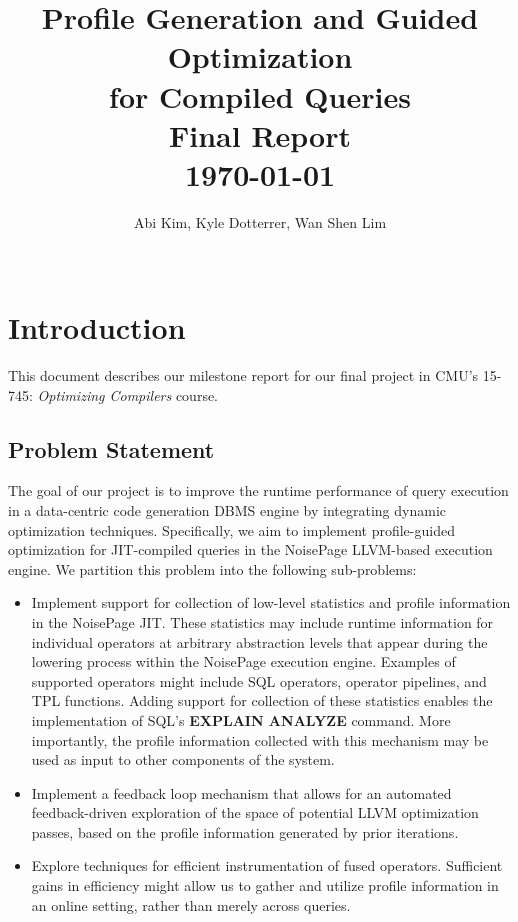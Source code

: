 \documentclass{vldb}
\newcommand{\paperTitle}{Profile Generation and Guided Optimization\\ for Compiled Queries\\ 
    \large Final Report\\
    \today}
\newcommand{\dbCode}[1]{{\sffamily\small \textbf{#1}}\xspace}
\begin{document}
\title{\paperTitle}

\author{
    \alignauthor Abi Kim, Kyle Dotterrer, Wan Shen Lim\\
    \\
}

\makeatletter
\def\@copyrightspace{\relax}
\makeatother

\maketitle


\section{Introduction}

This document describes our milestone report for our final project in CMU's 15-745: \textit{Optimizing Compilers} course. 

\subsection{Problem Statement}

The goal of our project is to improve the runtime performance of query execution in a data-centric code generation DBMS engine by integrating dynamic optimization techniques. Specifically, we aim to implement profile-guided optimization for JIT-compiled queries in the NoisePage \cite{noisepage} LLVM-based execution engine. We partition this problem into the following sub-problems:

\begin{itemize}
    \item Implement support for collection of low-level statistics and profile information in the NoisePage JIT. These statistics may include runtime information for individual operators at arbitrary abstraction levels that appear during the lowering process within the NoisePage execution engine. Examples of supported operators might include SQL operators, operator pipelines, and TPL functions.  Adding support for collection of these statistics enables the implementation of SQL's \dbCode{EXPLAIN ANALYZE} command. More importantly, the profile information collected with this mechanism may be used as input to other components of the system.
    \item Implement a feedback loop mechanism that allows for an automated feedback-driven exploration of the space of potential LLVM optimization passes, based on the profile information generated by prior iterations.
    \item Explore techniques for efficient instrumentation of fused operators. Sufficient gains in efficiency might allow us to gather and utilize profile information in an online setting, rather than merely across queries.
\end{itemize}
\end{document}
